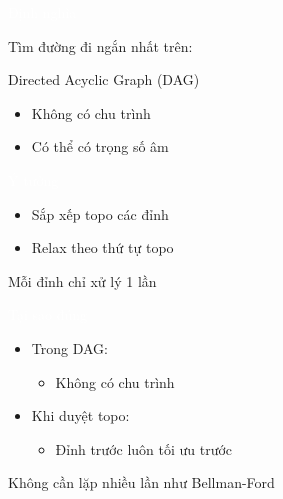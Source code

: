 \documentclass{beamer}
\title{\hlred{Shortest Path trên DAG}}
\author{Group 3}
\date{\hlcyan{03/2026}}
\newcommand{\hlblue}[1]{\textcolor{myblue}{#1}}
\newcommand{\hlgreen}[1]{\textcolor{mygreen}{#1}}
\newcommand{\hlred}[1]{\textcolor{myred}{#1}}
\newcommand{\hlpurple}[1]{\textcolor{mypurple}{#1}}
\newcommand{\hlwhite}[1]{\textcolor{white}{#1}}
\begin{document}
\frame{\titlepage}


\begin{frame}{\hlwhite{Định nghĩa}}
\begin{tcolorbox}[title=\textbf{\hlwhite{Khái niệm}}]
Tìm đường đi ngắn nhất trên:

\hlblue{Directed Acyclic Graph (DAG)}
\end{tcolorbox}

\begin{itemize}
\item Không có chu trình
\item Có thể có \hlred{trọng số âm}
\end{itemize}
\end{frame}


\begin{frame}{\hlwhite{Ý tưởng}}
\begin{itemize}
\item Sắp xếp topo các đỉnh
\item Relax theo thứ tự topo
\end{itemize}

\begin{tcolorbox}
\centering
\hlpurple{Mỗi đỉnh chỉ xử lý 1 lần}
\end{tcolorbox}
\end{frame}


\begin{frame}{\hlwhite{Tại sao đúng}}
\begin{itemize}
\item Trong DAG:
\begin{itemize}
\item Không có chu trình
\end{itemize}

\item Khi duyệt topo:
\begin{itemize}
\item Đỉnh trước luôn tối ưu trước
\end{itemize}
\end{itemize}

\begin{tcolorbox}
\centering
\hlgreen{Không cần lặp nhiều lần như Bellman-Ford}
\end{tcolorbox}
\end{frame}
\end{document}
